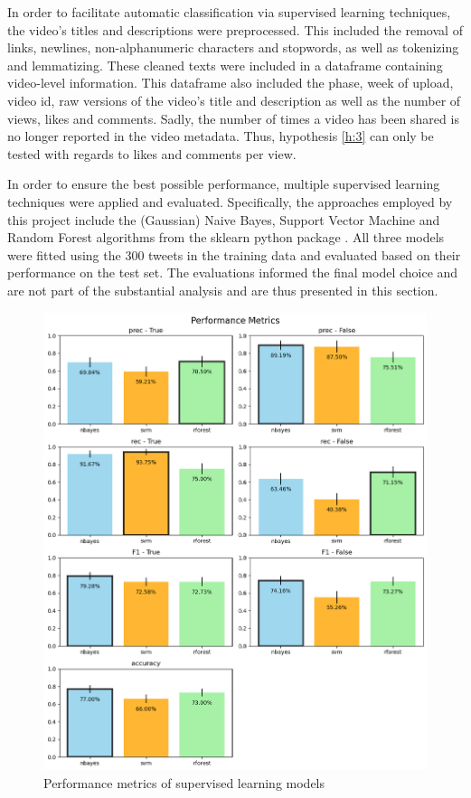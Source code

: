 \documentclass[fontsize=11pt, parskip=half]{scrartcl}
\begin{document}
    In order to facilitate automatic classification via supervised learning techniques, the video's titles and descriptions were preprocessed. This included the removal of links, newlines, non-alphanumeric characters and stopwords, as well as tokenizing and lemmatizing. These cleaned texts were included in a dataframe containing video-level information. This dataframe also included the phase, week of upload, video id, raw versions of the video's title and description as well as the number of views, likes and comments. Sadly, the number of times a video has been shared is no longer reported in the video metadata. Thus, hypothesis \ref{h:3} can only be tested with regards to likes and comments per view.

    In order to ensure the best possible performance, multiple supervised learning techniques were applied and evaluated. Specifically, the approaches employed by this project include the (Gaussian) Naive Bayes, Support Vector Machine and Random Forest algorithms from the sklearn python package \parencite{pedregosaScikitlearnMachineLearning2011}. All three models were fitted using the 300 tweets in the training data and evaluated based on their performance on the test set. The evaluations informed the final model choice and are not part of the substantial analysis and are thus presented in this section. 

    \begin{figure}
        \setlength\intextsep{0pt}
        \vspace{-10pt}
        \includegraphics[width=0.48 \textwidth]{img/labels_performance.png}
        \vspace{-5pt}
        \caption{Performance metrics of supervised learning models}
        \vspace{-10pt}
        \label{fig:performance}
    \end{figure}
\end{document}
